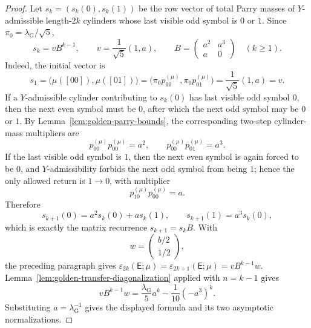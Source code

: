 \documentclass{etds}%
\numberwithin{equation}{section}
\theoremstyle{plain}
\theoremstyle{definition}
\theoremstyle{remark}
\begin{document}
\begin{proof}
Let $s_k=(s_k(0),s_k(1))$ be the row vector of total Parry masses of
$Y$-admissible length-$2k$ cylinders whose last visible odd symbol is $0$ or
$1$.  Since $\pi_0=\lambda_{\mathrm G}/\sqrt{5}$,
\[
s_k=vB^{k-1},\qquad
v=\frac1{\sqrt{5}}(1,a),\qquad
B=\begin{pmatrix}a^2&a^3\\ a&0\end{pmatrix}
\quad(k\ge 1).
\]
Indeed, the initial vector is
\[
s_1=\bigl(\mu([00]),\mu([01])\bigr)
=\bigl(\pi_0 p_{00}^{(\mu)},\pi_0 p_{01}^{(\mu)}\bigr)
=\frac1{\sqrt{5}}(1,a)=v.
\]
If a $Y$-admissible cylinder contributing to $s_k(0)$ has last visible odd
symbol $0$, then the next even symbol must be $0$, after which the next odd
symbol may be $0$ or $1$.  By Lemma~\ref{lem:golden-parry-bounds}, the
corresponding two-step cylinder-mass multipliers are
\[
p_{00}^{(\mu)}p_{00}^{(\mu)}=a^2,
\qquad
p_{00}^{(\mu)}p_{01}^{(\mu)}=a^3.
\]
If the last visible odd symbol is $1$, then the next even symbol is again
forced to be $0$, and $Y$-admissibility forbids the next odd symbol from being
$1$; hence the only allowed return is $1\to 0$, with multiplier
\[
p_{10}^{(\mu)}p_{00}^{(\mu)}=a.
\]
Therefore
\[
s_{k+1}(0)=a^2s_k(0)+as_k(1),\qquad
s_{k+1}(1)=a^3s_k(0),
\]
which is exactly the matrix recurrence $s_{k+1}=s_kB$.  With
\[
w=\begin{pmatrix}b/2\\[2pt]1/2\end{pmatrix},
\]
the preceding paragraph gives
$\varepsilon_{2k}(\mathsf{E};\mu)=\varepsilon_{2k+1}(\mathsf{E};\mu)
=vB^{k-1}w$.  Lemma~\ref{lem:golden-transfer-diagonalization} applied with
$n=k-1$ gives
\[
vB^{k-1}w=\frac{\lambda_{\mathrm G}}{5}a^k-\frac{1}{10}(-a^3)^k.
\]
Substituting $a=\lambda_{\mathrm G}^{-1}$ gives the displayed formula and its two
asymptotic normalizations.
\end{proof}
\end{document}
